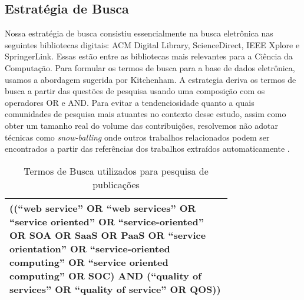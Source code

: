 \subsection{Estratégia de Busca}\label{estrategia_busca}
Nossa estratégia de busca consistiu essencialmente na busca eletrônica nas seguintes bibliotecas digitais: ACM Digital Library, ScienceDirect, IEEE Xplore e SpringerLink. Essas estão entre as bibliotecas mais relevantes para a Ciência da Computação. Para formular os termos de busca para a base de dados eletrônica, usamos a abordagem sugerida por Kitchenham\cite{}. A estrategia deriva os termos de busca a partir das questões de pesquisa  usando uma composição com os operadores OR e AND. Para evitar a tendenciosidade quanto a quais comunidades de pesquisa mais atuantes no contexto desse estudo, assim como obter um tamanho real do volume das contribuições, resolvemos não adotar técnicas como \emph{snow-balling} onde outros trabalhos relacionados podem ser encontrados a partir das referências dos trabalhos extraídos automaticamente \cite{}.

\begin{table}[ht]
\centering
\caption{Termos de Busca utilizados para pesquisa de publicações}
\label{tab:exTable1}
\begin{tabular}{p{0.75\linewidth}}
\hline
((``web service'' OR ``web services'' OR ``service oriented'' OR ``service-oriented'' OR SOA OR SaaS OR PaaS OR ``service orientation'' OR ``service-oriented computing'' OR ``service oriented computing'' OR SOC) AND (``quality of services'' OR ``quality of service'' OR QOS)) \\
\hline
\end{tabular}
\end{table}


